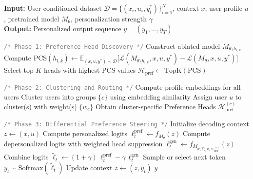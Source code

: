\documentclass[11pt]{article}
\begin{document}
\begin{algorithm*}[ht]
\caption{Differential Preference Steering with Heterogeneous Preferences}
\label{alg:dps}
\hspace*{\algorithmicindent} \textbf{Input:}
User-conditioned dataset $\mathcal{D} = \{(x_i, u_i, y_i^\ast)\}_{i=1}^N$,
context $x$, user profile $u$,
pretrained model $M_\theta$,
personalization strength $\gamma$ \\
\hspace*{\algorithmicindent} \textbf{Output:}
Personalized output sequence $y = (y_1, \ldots, y_T)$
\begin{algorithmic}[1]

\State \texttt{\textcolor{gray}{/* Phase 1: Preference Head Discovery */}}
    \State Construct ablated model $M_{\theta \setminus h_{l,k}}$
    \State Compute
    $
    \mathrm{PCS}(h_{l,k})
    \leftarrow
    \mathbb{E}_{(x,u,y^\ast)\sim\mathcal{D}}
    \big[
    \mathcal{L}(M_{\theta \setminus h_{l,k}}, x, u, y^\ast)
    -
    \mathcal{L}(M_\theta, x, u, y^\ast)
    \big]
    $
\EndFor
\State Select top $K$ heads with highest PCS values
\State $\mathcal{H}_{\mathrm{pref}} \leftarrow \mathrm{TopK}(\mathrm{PCS})$

\vspace{0.6em}
\State \texttt{\textcolor{gray}{/* Phase 2: Clustering and Routing */}}
\State Compute profile embeddings for all users
\State Cluster users into groups $\{c\}$ using embedding similarity
\State Assign user $u$ to cluster(s) with weight(s) $\{w_c\}$ 
    \State Obtain cluster-specific Preference Heads $\mathcal{H}_{\mathrm{pref}}^{(c)}$
\EndFor

\vspace{0.6em}
\State \texttt{\textcolor{gray}{/* Phase 3: Differential Preference Steering */}}
\State Initialize decoding context $z \leftarrow (x, u)$
    \State Compute personalized logits
    $
    \ell_t^{\mathrm{pref}} \leftarrow f_{M_\theta}(z)
    $
    \State Compute depersonalized logits with weighted head suppression
    $
    \ell_t^{\mathrm{gen}} \leftarrow
    f_{M_{\theta \setminus \sum_c w_c \mathcal{H}_{\mathrm{pref}}^{(c)}}}(z)
    $
    \State Combine logits
    $
    \tilde{\ell}_t \leftarrow (1 + \gamma)\,\ell_t^{\mathrm{pref}} - \gamma\,\ell_t^{\mathrm{gen}}
    $
    \State Sample or select next token
    $
    y_t \sim \mathrm{Softmax}(\tilde{\ell}_t)
    $
    \State Update context $z \leftarrow (z, y_t)$
\EndFor
\State \Return $y$
\end{algorithmic}
\end{algorithm*}
\end{document}
